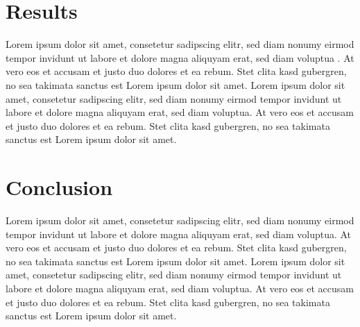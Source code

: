 \documentclass[a4paper]{article}
\begin{document}
\section{Results} %
\label{sec:results}
Lorem ipsum dolor sit amet, consetetur sadipscing elitr, sed diam nonumy eirmod tempor invidunt ut labore et dolore magna aliquyam erat, sed diam voluptua \citep[p. 48]{Baddeley:1974ts}. At vero eos et accusam et justo duo dolores et ea rebum. Stet clita kasd gubergren, no sea takimata sanctus est Lorem ipsum dolor sit amet. Lorem ipsum dolor sit amet, consetetur sadipscing elitr, sed diam nonumy eirmod tempor invidunt ut labore et dolore magna aliquyam erat, sed diam voluptua. At vero eos et accusam et justo duo dolores et ea rebum. Stet clita kasd gubergren, no sea takimata sanctus est Lorem ipsum dolor sit amet.

\section{Conclusion} %
\label{sec:conclusion}
Lorem ipsum dolor sit amet, consetetur sadipscing elitr, sed diam nonumy eirmod tempor invidunt ut labore et dolore magna aliquyam erat, sed diam voluptua. At vero eos et accusam et justo duo dolores et ea rebum. Stet clita kasd gubergren, no sea takimata sanctus est Lorem ipsum dolor sit amet. Lorem ipsum dolor sit amet, consetetur sadipscing elitr, sed diam nonumy eirmod tempor invidunt ut labore et dolore magna aliquyam erat, sed diam voluptua. At vero eos et accusam et justo duo dolores et ea rebum. Stet clita kasd gubergren, no sea takimata sanctus est Lorem ipsum dolor sit amet.


\newpage 


\end{document}
